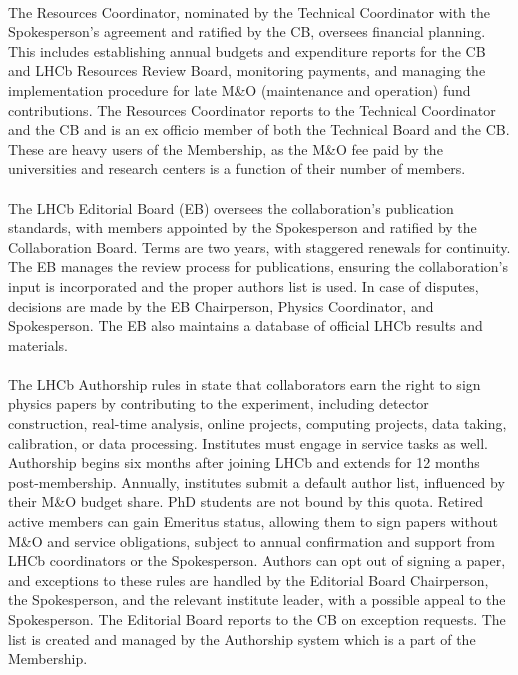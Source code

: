 \paragraph{}The Resources Coordinator, nominated by the Technical Coordinator with the Spokesperson's agreement and ratified by the CB, oversees financial planning. This includes establishing annual budgets and expenditure reports for the CB and LHCb Resources Review Board, monitoring payments, and managing the implementation procedure for late M\&O (maintenance and operation) fund contributions. The Resources Coordinator reports to the Technical Coordinator and the CB and is an ex officio member of both the Technical Board and the CB. These are heavy users of the Membership, as the M\&O fee paid by the universities and research centers is a function of their number of members. 

\paragraph{}The LHCb Editorial Board (EB) oversees the collaboration's publication standards, with members appointed by the Spokesperson and ratified by the Collaboration Board. Terms are two years, with staggered renewals for continuity. The EB manages the review process for publications, ensuring the collaboration's input is incorporated and the proper authors list is used. In case of disputes, decisions are made by the EB Chairperson, Physics Coordinator, and Spokesperson. The EB also maintains a database of official LHCb results and materials.

\paragraph{}The LHCb Authorship rules in \cite{LHCbConstitution} state that collaborators earn the right to sign physics papers by contributing to the experiment, including detector construction, real-time analysis, online projects, computing projects, data taking, calibration, or data processing. Institutes must engage in service tasks as well. Authorship begins six months after joining LHCb and extends for 12 months post-membership. Annually, institutes submit a default author list, influenced by their M\&O budget share. PhD students are not bound by this quota. Retired active members can gain Emeritus status, allowing them to sign papers without M\&O and service obligations, subject to annual confirmation and support from LHCb coordinators or the Spokesperson. Authors can opt out of signing a paper, and exceptions to these rules are handled by the Editorial Board Chairperson, the Spokesperson, and the relevant institute leader, with a possible appeal to the Spokesperson. The Editorial Board reports to the CB on exception requests. The list is created and managed by the Authorship system which is a part of the Membership.

